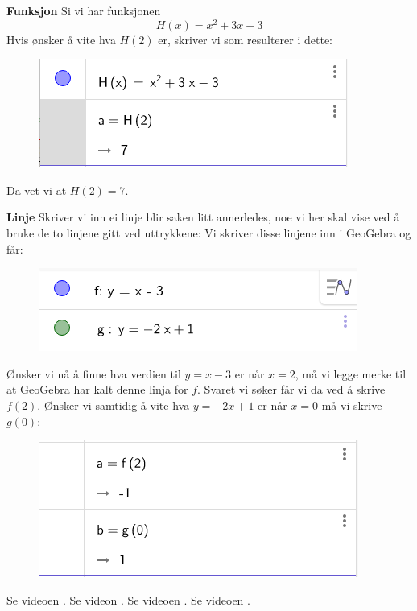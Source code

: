 \textbf{Funksjon}\bs
Si vi har funksjonen
\[H(x)= x^2 + 3x -3 \]
Hvis ønsker å vite hva $ H(2) $ er, skriver vi
som resulterer i dette:
\begin{figure}[H]
	\centering
	\includegraphics[scale=0.6]{H}
\end{figure}
Da vet vi at $ H(2)=7 $.\vsk

\textbf{Linje}\bs
Skriver vi inn ei linje blir saken litt annerledes, noe vi her skal vise ved å bruke de to linjene gitt ved uttrykkene:
Vi skriver disse  linjene inn i GeoGebra og får:
\begin{figure}[H]
	\centering
	\includegraphics[scale=0.6]{fglin1}
\end{figure}
Ønsker vi nå å finne hva verdien til $ {y=x-3} $ er når $ {x=2} $, må vi legge merke til at GeoGebra har kalt denne linja for $ f $. Svaret vi søker får vi da ved å skrive $ f(2) $. Ønsker vi samtidig å vite hva $ {y=-2x+1} $ er når $ {x=0} $ må vi skrive $ g(0) $:
\begin{figure}[H]
	\centering
	\includegraphics[scale=0.6]{fglin2}
\end{figure}
Se videoen .
Se videon
.
Se videoen .
Se videoen .

